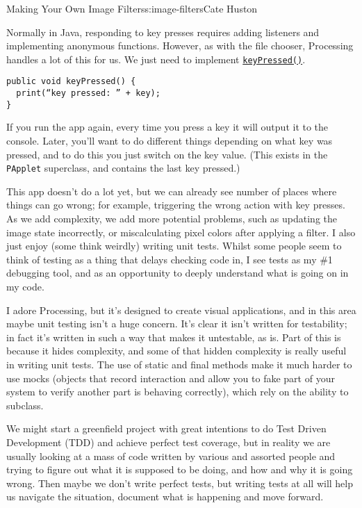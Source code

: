 \begin{aosachapter}{Making Your Own Image Filters}{s:image-filters}{Cate Huston}
\label{responding-to-key-presses}

Normally in Java, responding to key presses requires adding listeners
and implementing anonymous functions. However, as with the file chooser,
Processing handles a lot of this for us. We just need to implement
\href{https://www.processing.org/reference/keyPressed_.html}{\texttt{keyPressed()}}.

\begin{verbatim}
public void keyPressed() {
  print(“key pressed: ” + key);
}
\end{verbatim}

If you run the app again, every time you press a key it will output it
to the console. Later, you'll want to do different things depending on
what key was pressed, and to do this you just switch on the key value.
(This exists in the \texttt{PApplet} superclass, and contains the last
key pressed.)

\label{writing-tests}

This app doesn't do a lot yet, but we can already see number of places
where things can go wrong; for example, triggering the wrong action with
key presses. As we add complexity, we add more potential problems, such
as updating the image state incorrectly, or miscalculating pixel colors
after applying a filter. I also just enjoy (some think weirdly) writing
unit tests. Whilst some people seem to think of testing as a thing that
delays checking code in, I see tests as my \#1 debugging tool, and as an
opportunity to deeply understand what is going on in my code.

I adore Processing, but it's designed to create visual applications, and
in this area maybe unit testing isn't a huge concern. It's clear it
isn't written for testability; in fact it's written in such a way that
makes it untestable, as is. Part of this is because it hides complexity,
and some of that hidden complexity is really useful in writing unit
tests. The use of static and final methods make it much harder to use
mocks (objects that record interaction and allow you to fake part of
your system to verify another part is behaving correctly), which rely on
the ability to subclass.

We might start a greenfield project with great intentions to do Test
Driven Development (TDD) and achieve perfect test coverage, but in
reality we are usually looking at a mass of code written by various and
assorted people and trying to figure out what it is supposed to be
doing, and how and why it is going wrong. Then maybe we don't write
perfect tests, but writing tests at all will help us navigate the
situation, document what is happening and move forward.


\end{aosachapter}
